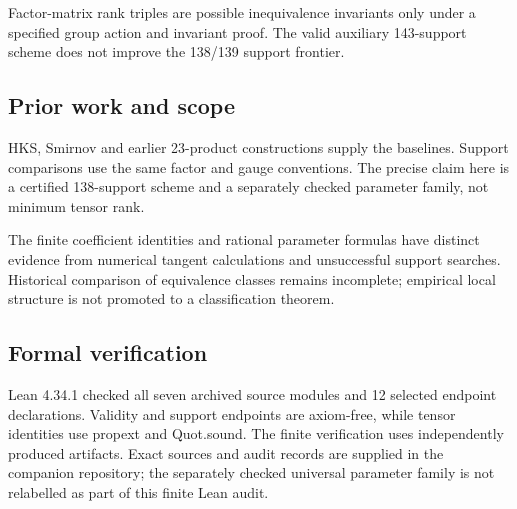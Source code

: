 \documentclass[11pt,a4paper]{article}
\begin{document}
Factor-matrix rank triples are possible inequivalence invariants only under a specified group action and invariant proof. The valid auxiliary 143-support scheme does not improve the 138/139 support frontier.

\subsection{Prior work and scope}
HKS, Smirnov and earlier 23-product constructions supply the baselines. Support comparisons use the same factor and gauge conventions. The precise claim here is a certified 138-support scheme and a separately checked parameter family, not minimum tensor rank.

\begin{samepage}
The finite coefficient identities and rational parameter formulas have distinct evidence from numerical tangent calculations and unsuccessful support searches. Historical comparison of equivalence classes remains incomplete; empirical local structure is not promoted to a classification theorem.

\end{samepage}
\subsection{Formal verification}
Lean 4.34.1 checked all seven archived source modules and 12 selected endpoint declarations. Validity and support endpoints are axiom-free, while tensor identities use propext and Quot.sound. The finite verification uses independently produced artifacts. Exact sources and audit records are supplied in the companion repository; the separately checked universal parameter family is not relabelled as part of this finite Lean audit.
\end{document}
